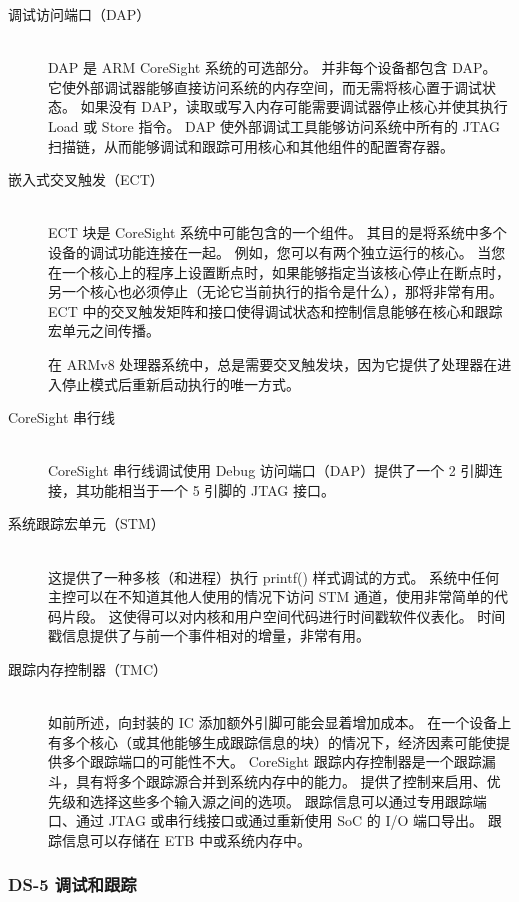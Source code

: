 \begin{description}
  \item[调试访问端口（DAP）] \hfill \\
    DAP 是 ARM CoreSight 系统的可选部分。
    并非每个设备都包含 DAP。
    它使外部调试器能够直接访问系统的内存空间，而无需将核心置于调试状态。
    如果没有 DAP，读取或写入内存可能需要调试器停止核心并使其执行 Load 或 Store 指令。
    DAP 使外部调试工具能够访问系统中所有的 JTAG 扫描链，从而能够调试和跟踪可用核心和其他组件的配置寄存器。

  \item [嵌入式交叉触发（ECT）] \hfill \\
    ECT 块是 CoreSight 系统中可能包含的一个组件。
    其目的是将系统中多个设备的调试功能连接在一起。
    例如，您可以有两个独立运行的核心。
    当您在一个核心上的程序上设置断点时，如果能够指定当该核心停止在断点时，另一个核心也必须停止（无论它当前执行的指令是什么），那将非常有用。
    ECT 中的交叉触发矩阵和接口使得调试状态和控制信息能够在核心和跟踪宏单元之间传播。

    在 ARMv8 处理器系统中，总是需要交叉触发块，因为它提供了处理器在进入停止模式后重新启动执行的唯一方式。

  \item[CoreSight 串行线] \hfill \\
    CoreSight 串行线调试使用 Debug 访问端口（DAP）提供了一个 2 引脚连接，其功能相当于一个 5 引脚的 JTAG 接口。

  \item[系统跟踪宏单元（STM）] \hfill \\
    这提供了一种多核（和进程）执行 printf() 样式调试的方式。
    系统中任何主控可以在不知道其他人使用的情况下访问 STM 通道，使用非常简单的代码片段。
    这使得可以对内核和用户空间代码进行时间戳软件仪表化。
    时间戳信息提供了与前一个事件相对的增量，非常有用。

  \item[跟踪内存控制器（TMC）] \hfill \\
    如前所述，向封装的 IC 添加额外引脚可能会显着增加成本。
    在一个设备上有多个核心（或其他能够生成跟踪信息的块）的情况下，经济因素可能使提供多个跟踪端口的可能性不大。
    CoreSight 跟踪内存控制器是一个跟踪漏斗，具有将多个跟踪源合并到系统内存中的能力。
    提供了控制来启用、优先级和选择这些多个输入源之间的选项。
    跟踪信息可以通过专用跟踪端口、通过 JTAG 或串行线接口或通过重新使用 SoC 的 I/O 端口导出。
    跟踪信息可以存储在 ETB 中或系统内存中。
\end{description}


\subsubsection{DS-5 调试和跟踪}


